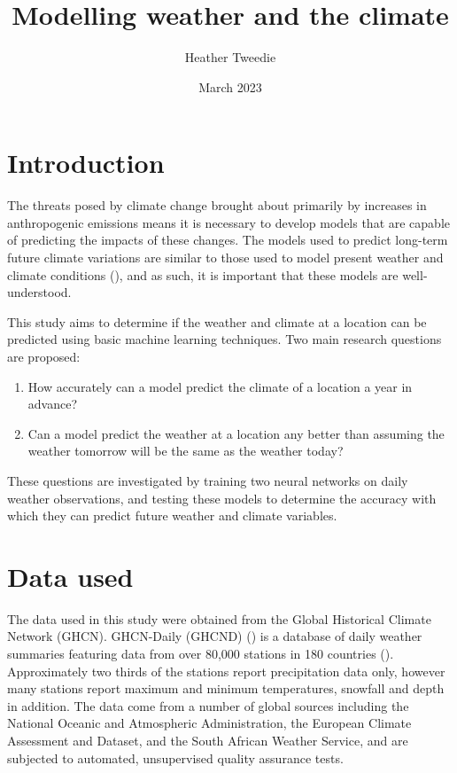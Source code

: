 \documentclass[12pt]{article}
\title{Modelling weather and the climate}
\author{Heather Tweedie}
\date{March 2023}
\begin{document}
\markboth{\theauthor}{\thetitle}

\maketitle

\section{Introduction}

    The threats posed by climate change brought about primarily by increases in anthropogenic emissions means it is necessary 
    to develop models that are capable of predicting the impacts of these changes. The models used to predict long-term future 
    climate variations are similar to those used to model present weather and climate conditions (\cite{raisanen_2007_how}), 
    and as such, it is important that these models are well-understood.
    
    This study aims to determine if the weather and climate at a location can be predicted using basic machine learning techniques. 
    Two main research questions are proposed:
    
    \begin{enumerate}
      \item How accurately can a model predict the climate of a location a year in advance?
      \item Can a model predict the weather at a location any better than assuming the weather tomorrow will be the same as the 
      weather today?
    \end{enumerate}

    These questions are investigated by training two neural networks on daily weather observations, and testing these models to 
    determine the accuracy with which they can predict future weather and climate variables.
    
\section{Data used}

    The data used in this study were obtained from the Global Historical Climate Network (GHCN). GHCN-Daily (GHCND) (\cite{menne_2012_global}) 
    is a database of daily weather summaries featuring data from over 80,000 stations in 180 countries (\cite{menne_2012_an}). Approximately 
    two thirds of the stations report precipitation data only, however many stations report maximum and minimum temperatures, snowfall and 
    depth in addition. The data come from a number of global sources including the National Oceanic and Atmospheric Administration, the 
    European Climate Assessment and Dataset, and the South African Weather Service, and are subjected to automated, unsupervised quality 
    assurance tests.
    
\end{document}
